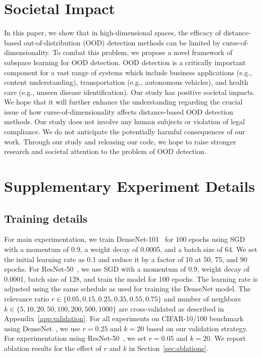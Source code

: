 \documentclass[letterpaper]{article} %
\theoremstyle{plain}
\theoremstyle{definition}
\theoremstyle{remark}
\begin{document}
\section{Societal Impact}
\label{sec:impact}
In this paper, we show that in high-dimensional spaces, the efficacy of distance-based out-of-distribution (OOD) detection methods can be limited by curse-of-dimensionality. To combat this problem, we propose a novel framework of subspace learning for OOD detection. OOD detection is a critically important component for a vast range of systems which include
business applications (e.g., content understanding), transportation (e.g., autonomous vehicles), and health care (e.g., unseen disease identification). Our study has positive societal impacts. We hope that it will further enhance the understanding regarding the crucial issue of how curse-of-dimensionality affects distance-based OOD detection methods. Our study does not involve any human subjects or violation of legal compliance. We do not anticipate the potentially harmful consequences of our work. Through our study and releasing our code, we hope to raise stronger research and societal attention to the problem of OOD detection.




\section{Supplementary Experiment Details}
\label{app:experimental_details}
 \subsection{Training details} 
\label{app:train_details}
For main experimentation, we train DenseNet-101~\cite{huang2018densely} for 100 epochs using SGD with a momentum of 0.9, a weight decay of 0.0005, and a batch size of 64. We set the
initial learning rate as 0.1 and reduce it by a factor of 10 at 50, 75, and 90 epochs. For ResNet-50~\cite{he2016deep}, we use SGD with a momentum of 0.9, weight decay of 0.0001, batch size of 128, and train the model for 100 epochs. The learning rate is adjusted using the same schedule as used for training the DenseNet model. 
The relevance ratio $r \in \{0.05, 0.15, 0.25, 0.35, 0.55, 0.75\}$ and number of neighbors $k \in \{5,10,20,50,100,200,500,1000\}$ are cross-validated as described in Appendix~\ref{app:validation}. For all experiments on CIFAR-10/100 benchmark using DenseNet~\cite{huang2018densely}, we use $r=0.25$ and $k=20$ based on our validation strategy. For experimentation using ResNet-50~\cite{he2016deep}, we set $r=0.05$ and $k=20$. We report ablation results for the effect of $r$ and $k$ in Section~\ref{sec:ablations}.
\end{document}
